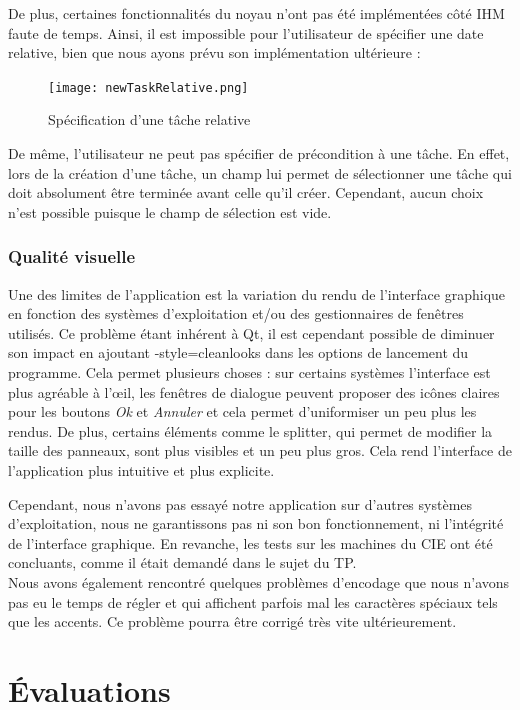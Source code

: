 			\newpage
			De plus, certaines fonctionnalités du noyau n'ont pas été implémentées côté IHM faute de temps. Ainsi, il est impossible pour l'utilisateur de spécifier une date relative, bien que nous ayons prévu son implémentation ultérieure :
			\begin{figure}[h!]
				\centering
			   \texttt{[image: newTaskRelative.png]}
			   \caption{Spécification d'une tâche relative}
			\end{figure}
			\FloatBarrier
		
			De même, l'utilisateur ne peut pas spécifier de précondition à une tâche. En effet, lors de la création d'une tâche, un champ lui permet de sélectionner une tâche qui doit absolument être terminée avant celle qu'il créer. Cependant, aucun choix n'est possible puisque le champ de sélection est vide.
			
		
		\subsection{Qualité visuelle}
			Une des limites de l'application est la variation du rendu de l'interface graphique en fonction des systèmes d'exploitation et/ou des gestionnaires de fenêtres utilisés. Ce problème étant inhérent à Qt, il est cependant possible de diminuer son impact en ajoutant \og -style=cleanlooks \fg dans les options de lancement du programme. Cela permet plusieurs choses : sur certains systèmes l'interface est plus agréable à l'{\oe}il, les fenêtres de dialogue peuvent proposer des icônes claires pour les boutons \emph{Ok} et \emph{Annuler} et cela permet d'uniformiser un peu plus les rendus. De plus, certains éléments comme le splitter, qui permet de modifier la taille des panneaux, sont plus visibles et un peu plus gros. Cela rend l'interface de l'application plus intuitive et plus explicite.
	
			Cependant, nous n'avons pas essayé notre application sur d'autres systèmes d'exploitation, nous ne garantissons pas ni son bon fonctionnement, ni l'intégrité de l'interface graphique. En revanche, les tests sur les machines du CIE ont été concluants, comme il était demandé dans le sujet du TP.\\
			
			Nous avons également rencontré quelques problèmes d'encodage que nous n'avons pas eu le temps de régler et qui affichent parfois mal les caractères spéciaux tels que les accents. Ce problème pourra être corrigé très vite ultérieurement.


\chapter{Évaluations}
	

